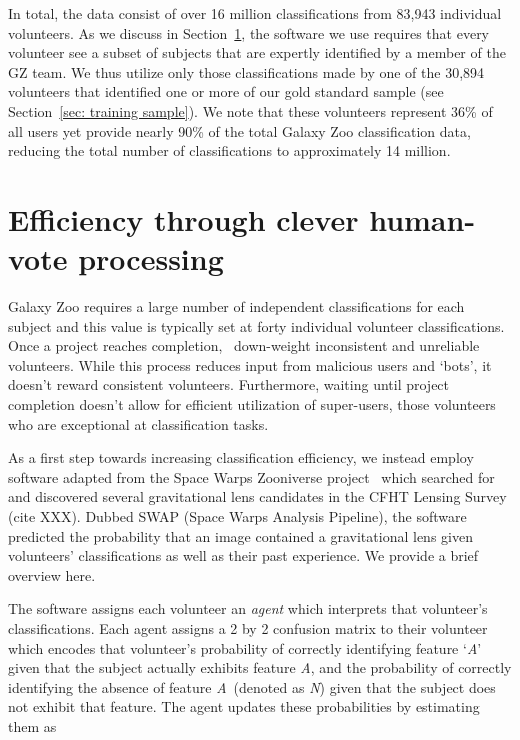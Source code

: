 \documentclass[twocolumn]{aastex6}
\newcommand{\A}{\textit{A}}
\newcommand{\N}{\textit{N}}
\begin{document}
In total, the data consist of over 16 million classifications from 83,943 individual volunteers. 
As we discuss in Section~\ref{sec: SWAP}, the software we use requires that every 
volunteer see a subset of subjects that are expertly identified by a member of the GZ team. 
We thus utilize only those classifications made by one of the 30,894 volunteers that 
identified one or more of our gold standard sample (see Section~\ref{sec: training sample}). 
We note that these volunteers represent 36\% of all users 
yet provide nearly 90\% of the total Galaxy Zoo classification data, 
reducing the total number of classifications to approximately 14 million.





\section{Efficiency through clever human-vote processing}\label{sec: SWAP}

Galaxy Zoo requires a large number of independent classifications for each subject and
 this value is typically set at forty individual volunteer classifications. 
Once a project reaches completion,~\cite{Willett2013} down-weight inconsistent 
and unreliable volunteers.  
While this process reduces input from malicious users and `bots', 
it doesn't reward consistent volunteers. Furthermore, waiting until project completion 
doesn't allow for efficient utilization of super-users, those volunteers who are 
exceptional at classification tasks.

As a first step towards increasing classification efficiency, we instead employ 
software adapted from the Space Warps Zooniverse project~\citep{Marshall2016} 
which searched for and discovered several gravitational lens 
candidates in the CFHT Lensing Survey (cite XXX).  Dubbed SWAP (Space Warps Analysis Pipeline),  
the software predicted the probability that an image contained a gravitational lens given 
volunteers' classifications as well as their past experience. We provide a brief overview here.  

The software assigns each volunteer an \textit{agent} which interprets that volunteer's 
classifications. Each agent assigns a 2 by 2 confusion matrix to their volunteer which encodes
that volunteer's probability of correctly identifying feature `\A'  given that the subject 
actually exhibits feature \A, and the probability of correctly identifying
the absence of feature \A~(denoted as \N) given that the subject does not exhibit 
that feature. The agent updates these probabilities by estimating them as 
\end{document}

